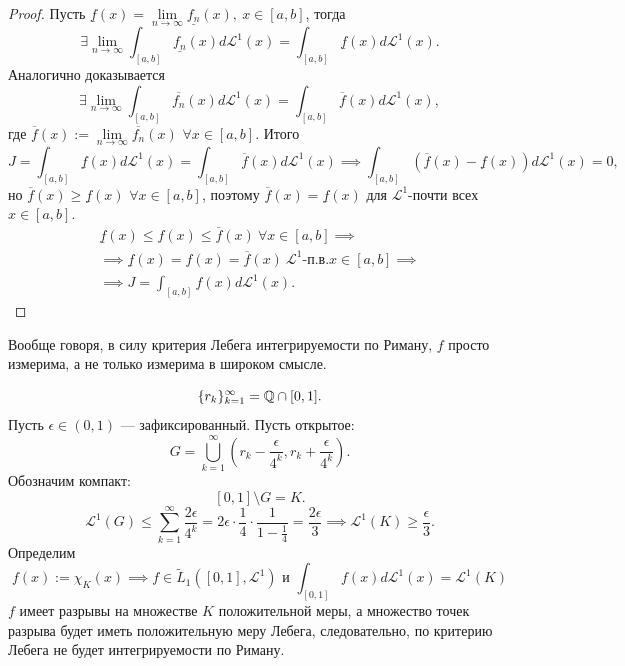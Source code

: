 \begin{proof}
    Пусть $\underline{f}(x) = \lim\limits_{n\to \infty} \underline{f_n}(x), \ x \in [a,b]$, тогда
    \[\exists \lim\limits_{n\to \infty} \int_{[a,b]} \underline{f_n}(x) d \mathcal{L}^1(x) = \int_{[a,b]} \underline{f}(x) d \mathcal{L}^1(x).\]
    Аналогично доказывается
    \[\exists \lim\limits_{n\to \infty} \int_{[a,b]} \overline{f_n}(x) d \mathcal{L}^1(x) = \int_{[a,b]} \overline{f}(x) d \mathcal{L}^1(x),\]
    где $\overline{f}(x) := \lim\limits_{n\to \infty} \overline{f_n}(x)$ $\forall x \in [a,b]$.
    Итого
    \[J = \int_{[a,b]} \underline{f}(x) d \mathcal{L}^1(x) = \int_{[a,b]} \overline{f}(x) d \mathcal{L}^1(x) \implies
    \int_{[a,b]} (\overline{f}(x) - \underline{f}(x))d \mathcal{L}^1(x) = 0,\]
    но $\overline{f}(x) \geqslant \underline{f}(x)$ $\forall x \in [a,b]$, поэтому
    $\overline{f}(x) = \underline{f}(x)$ для $\mathcal{L}^1$-почти всех $x \in [a,b]$.
    \begin{multline*}
        \underline{f}(x) \leqslant f(x) \leqslant \overline{f}(x) \ \forall x \in [a,b]
        \implies\\\implies
        \underline{f}(x) = f(x) = \overline{f}(x) \ \mathcal{L}^1 \text{-п.в.} x \in [a,b]
        \implies\\\implies
        J = \int_{[a,b]} f(x) d \mathcal{L}^1(x).
    \end{multline*} 
\end{proof} 

\begin{remark}
    Вообще говоря, в силу критерия Лебега интегрируемости по Риману, $f$ просто измерима, а не только измерима в широком смысле.
\end{remark}

\begin{example}
    \[\{r_k\}_{k=1}^\infty = \mathbb{Q} \cap [0,1].\]
    Пусть $\epsilon \in (0,1)$ — зафиксированный.
    Пусть открытое:
    \[G = \bigcup\limits_{k=1}^{\infty} \left(r_k - \frac{\epsilon}{4^k}, r_k + \frac{\epsilon}{4^k}\right).\]
    Обозначим компакт:
    \[[0,1] \setminus G = K.\]
    \[\mathcal{L}^1(G) \leqslant \sum\limits_{k=1}^{\infty} \frac{2 \epsilon}{4^k} = 2\epsilon \cdot \frac{1}{4} \cdot \frac{1}{1-\frac{1}{4}} = \frac{2\epsilon}{3}
    \implies
    \mathcal{L}^1(K) \geqslant \frac{\epsilon}{3}.\]
    Определим 
    \[f(x) := \chi_K(x) \implies f \in \widetilde{L}_1([0,1],\mathcal{L}^1) \text{ и } 
    \int_{[0,1]}f(x) d \mathcal{L}^1(x) = \mathcal{L}^1(K)\]
    $f$ имеет разрывы на множестве $K$ положительной меры, а множество точек разрыва будет иметь положительную меру Лебега, следовательно, по критерию Лебега не будет интегрируемости по Риману.
\end{example}